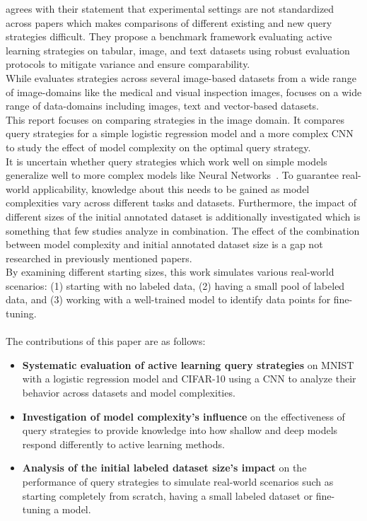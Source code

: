 \documentclass{article}
\theoremstyle{plain}
\theoremstyle{definition}
\theoremstyle{remark}
\begin{document}
\cite{werner_comparableactivelearning} agrees with their statement that experimental settings are not standardized across papers which makes comparisons of different existing and new query strategies difficult. They propose a benchmark framework evaluating active learning strategies on tabular, image, and text datasets using robust evaluation protocols to mitigate variance and ensure comparability. \\
While \cite{ueno_benchmarkingofquerystrategies} evaluates strategies across several image-based datasets from a wide range of image-domains like the medical and visual inspection images, \cite{werner_comparableactivelearning} focuses on a wide range of data-domains including images, text and vector-based datasets. \\
This report focuses on comparing strategies in the image domain. It compares query strategies for a simple logistic regression model and a more complex CNN to study the effect of model complexity on the optimal query strategy. \\
It is uncertain whether query strategies which work well on simple models generalize well to more complex models like Neural Networks~\cite{schröder_surveyactivelearningtext}. To guarantee real-world applicability, knowledge about this needs to be gained as model complexities vary across different tasks and datasets. Furthermore, the impact of different sizes of the initial annotated dataset is additionally investigated which is something that few studies analyze in combination. The effect of the combination between model complexity and initial annotated dataset size is a gap not researched in previously mentioned papers. \\
By examining different starting sizes, this work simulates various real-world scenarios: (1) starting with no labeled data, (2) having a small pool of labeled data, and (3) working with a well-trained model to identify data points for fine-tuning.
\\
\\
The contributions of this paper are as follows:
\begin{itemize}
	\item \textbf{Systematic evaluation of active learning query strategies} on MNIST with a logistic regression model and CIFAR-10 using a CNN to analyze their behavior across datasets and model complexities.
	\item \textbf{Investigation of model complexity's influence} on the effectiveness of query strategies to provide knowledge into how shallow and deep models respond differently to active learning methods.
	\item \textbf{Analysis of the initial labeled dataset size's impact} on the performance of query strategies to simulate real-world scenarios such as starting completely from scratch, having a small labeled dataset or fine-tuning a model.
\end{itemize}
\end{document}
